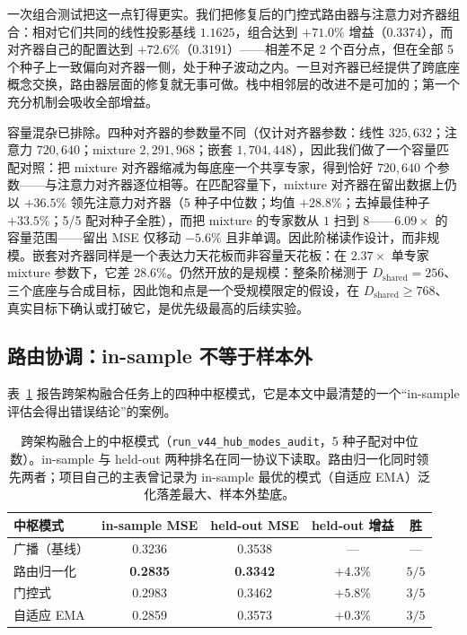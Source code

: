 \documentclass[10pt,twoside]{article}
\theoremstyle{definition}
\theoremstyle{plain}
\theoremstyle{remark}
\begin{document}
一次组合测试把这一点钉得更实。我们把修复后的门控式路由器与注意力对齐器组合：相对它们共同的线性投影基线 $1.1625$，组合达到 $+71.0\%$ 增益（$0.3374$），而对齐器自己的配置达到 $+72.6\%$（$0.3191$）——相差不足 2 个百分点，但在全部 5 个种子上一致偏向对齐器一侧，处于种子波动之内。一旦对齐器已经提供了跨底座概念交换，路由器层面的修复就无事可做。栈中相邻层的改进不是可加的；第一个充分机制会吸收全部增益。

容量混杂已排除。四种对齐器的参数量不同（仅计对齐器参数：线性 $325{,}632$；注意力 $720{,}640$；mixture $2{,}291{,}968$；嵌套 $1{,}704{,}448$），因此我们做了一个容量匹配对照：把 mixture 对齐器缩减为每底座一个共享专家，得到恰好 $720{,}640$ 个参数——与注意力对齐器逐位相等。在匹配容量下，mixture 对齐器在留出数据上仍以 $+36.5\%$ 领先注意力对齐器（5 种子中位数；均值 $+28.8\%$；去掉最佳种子 $+33.5\%$；5/5 配对种子全胜），而把 mixture 的专家数从 $1$ 扫到 $8$——$6.09\times$ 的容量范围——留出 MSE 仅移动 $-5.6\%$ 且非单调。因此阶梯读作设计，而非规模。嵌套对齐器同样是一个表达力天花板而非容量天花板：在 $2.37\times$ 单专家 mixture 参数下，它差 $28.6\%$。仍然开放的是规模：整条阶梯测于 $D_{\text{shared}}{=}256$、三个底座与合成目标，因此饱和点是一个受规模限定的假设，在 $D_{\text{shared}}{\geq}768$、真实目标下确认或打破它，是优先级最高的后续实验。

\subsection{路由协调：in-sample 不等于样本外}
\label{sec:hub-exp}

表~\ref{tab:hub} 报告跨架构融合任务上的四种中枢模式，它是本文中最清楚的一个``in-sample 评估会得出错误结论''的案例。

\begin{table}[htbp]
\centering
\caption{跨架构融合上的中枢模式（\texttt{run\_v44\_hub\_modes\_audit}，5 种子配对中位数）。in-sample 与 held-out 两种排名在同一协议下读取。路由归一化同时领先两者；项目自己的主表曾记录为 in-sample 最优的模式（自适应 EMA）泛化落差最大、样本外垫底。}
\label{tab:hub}
\small
\setlength{\tabcolsep}{5pt}
\begin{tabular}{lcccc}
\toprule
\textbf{中枢模式} & \textbf{in-sample MSE} & \textbf{held-out MSE} & \textbf{held-out 增益} & \textbf{胜} \\
\midrule
广播（基线） & 0.3236 & 0.3538 & --- & --- \\
路由归一化 & \textbf{0.2835} & \textbf{0.3342} & $+4.3\%$ & $5/5$ \\
门控式 & 0.2983 & 0.3462 & $+5.8\%$ & $3/5$ \\
自适应 EMA & 0.2859 & 0.3573 & $+0.3\%$ & $3/5$ \\
\bottomrule
\end{tabular}
\end{table}
\end{document}
